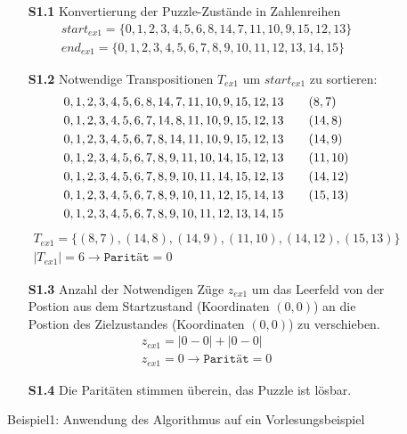 \begin{figure}[H]
	\begin{enumerate}
		\item[\textbf{S1.1}] Konvertierung der Puzzle-Zustände in Zahlenreihen
		      \begin{align*}
			      start_{ex1} = \{0,1,2,3,4,5,6,8,14,7,11,10,9,15,12,13\} \\
			      end_{ex1} = \{0,1,2,3,4,5,6,7,8,9,10,11,12,13,14,15\}
		      \end{align*}
		\item[\textbf{S1.2}] Notwendige Transpositionen $T_{ex1}$ um $start_{ex1}$ zu sortieren:
		      \begin{align*}
			      0,1,2,3,4,5,6,8,14,7,11,10,9,15,12,13 & \hspace{20pt} (\space 8,\space 7) \\
			      0,1,2,3,4,5,6,7,14,8,11,10,9,15,12,13 & \hspace{20pt} (14,\space 8)       \\
			      0,1,2,3,4,5,6,7,8,14,11,10,9,15,12,13 & \hspace{20pt} (14,\space 9)       \\
			      0,1,2,3,4,5,6,7,8,9,11,10,14,15,12,13 & \hspace{20pt} (11,10)             \\
			      0,1,2,3,4,5,6,7,8,9,10,11,14,15,12,13 & \hspace{20pt} (14,12)             \\
			      0,1,2,3,4,5,6,7,8,9,10,11,12,15,14,13 & \hspace{20pt} (15,13)             \\
			      0,1,2,3,4,5,6,7,8,9,10,11,12,13,14,15 &
		      \end{align*}
		      \begin{align*}
			      T_{ex1} = \{(8,7),(14,8),(14,9),(11,10),(14,12),(15,13)\} \\
			      \left\vert T_{ex1}\right\vert = 6 \rightarrow \texttt{Parität} = 0
		      \end{align*}
		\item[\textbf{S1.3}] Anzahl der Notwendigen Züge $z_{ex1}$ um das Leerfeld von der Postion aus dem Startzustand (Koordinaten $(0,0)$) an die Postion des Zielzustandes (Koordinaten $(0,0)$) zu verschieben.
		      \begin{align*}
			      z_{ex1} = \left | 0 - 0 \right | + \left | 0 - 0 \right | \\
			      z_{ex1} = 0 \rightarrow \texttt{Parität} = 0
		      \end{align*}
		\item[\textbf{S1.4}] Die Paritäten stimmen überein, das Puzzle \textcolor{OliveGreen}{ist lösbar}.
	\end{enumerate}
	\caption{Beispiel1: Anwendung des Algorithmus auf ein Vorlesungsbeispiel \label{fig:Ex1_algo}}
\end{figure}
